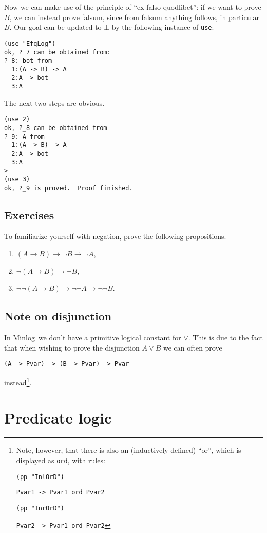 \documentclass[12pt]{amsart}
\newcommand{\falsum}{\bot}
\newcommand{\inquotes}[1]{``#1''}
\newcommand{\mi}{Minlog}
\begin{document}
Now we can make use of the principle of \inquotes{ex falso quodlibet}:
if we want to prove $B$, we can instead prove falsum, since from
falsum anything follows, in particular $B$.  Our goal can be updated
to $\falsum$ by the following instance of \texttt{use}:
\begin{verbatim}
(use "EfqLog")
ok, ?_7 can be obtained from:
?_8: bot from
  1:(A -> B) -> A
  2:A -> bot
  3:A
\end{verbatim}

The next two steps are obvious.
\begin{verbatim}
(use 2)
ok, ?_8 can be obtained from
?_9: A from
  1:(A -> B) -> A
  2:A -> bot
  3:A
>
(use 3)
ok, ?_9 is proved.  Proof finished.
\end{verbatim}


\subsection{Exercises}
To familiarize yourself with negation, prove the following
propositions.
\begin{enumerate}
  \item $(A \to B) \to \neg B \to \neg A$,
  \item $\neg (A \to B) \to \neg B$,
  \item $\neg \neg (A \to B) \to \neg \neg A \to \neg \neg B$.
\end{enumerate}


\subsection{Note on disjunction}
In \mi\ we don't have a primitive logical constant for $\lor$.  This
is due to the fact that when wishing to prove the disjunction $A \lor
B$ we can often prove
\begin{verbatim}
(A -> Pvar) -> (B -> Pvar) -> Pvar
\end{verbatim}
instead\footnote{Note, however, that there is also an (inductively
  defined) \inquotes{or}, which is displayed as \texttt{ord}, with
  rules:

\texttt{(pp "InlOrD")}

\texttt{Pvar1 -> Pvar1 ord Pvar2}

\texttt{(pp "InrOrD")}

\texttt{Pvar2 -> Pvar1 ord Pvar2}
}.


\section{Predicate logic}
\end{document}
